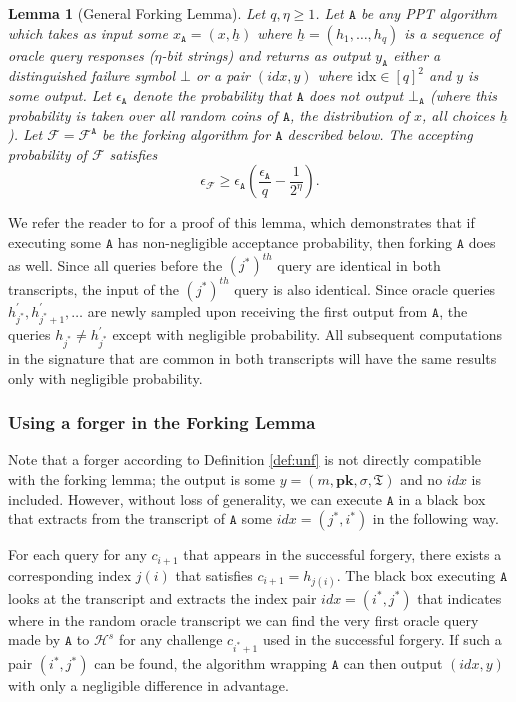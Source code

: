 \documentclass{article}
\theoremstyle{plain}
\newtheorem{lemma}{Lemma}[section]
\theoremstyle{definition}
\begin{document}
\begin{lemma}[General Forking Lemma]\label{lem:fork}
Let $q, \eta \geq 1$. Let $\texttt{A}$ be any PPT algorithm which takes as input some $x_\texttt{A} = (x, \underline{h})$ where $\underline{h} = (h_1, \ldots, h_q)$ is a sequence of oracle query responses ($\eta$-bit strings) and returns as output $y_{\texttt{A}}$ either a distinguished failure symbol $\bot$ or a pair $(\textit{idx}, y)$ where $\text{idx} \in [q]^2$ and $y$ is some output. Let $\epsilon_{\texttt{A}}$ denote the probability that $\texttt{A}$ does not output $\bot_{\texttt{A}}$ (where this probability is taken over all random coins of $\texttt{A}$, the distribution of $x$, all choices $\underline{h}$). Let $\mathcal{F} = \mathcal{F}^{\texttt{A}}$ be the forking algorithm for $\texttt{A}$ described below. The accepting probability of $\mathcal{F}$ satisfies \[\epsilon_{\mathcal{F}} \geq \epsilon_{\texttt{A}} \left(\frac{\epsilon_{\texttt{A}}}{q} - \frac{1}{2^\eta}\right).\]
\end{lemma}

We refer the reader to \cite{bellare} for a proof of this lemma, which demonstrates that if executing some $\texttt{A}$ has non-negligible acceptance probability, then forking $\texttt{A}$ does as well. Since all queries before the $(j^*)^{th}$ query are identical in both transcripts, the input of the $(j^*)^{th}$ query is also identical. Since oracle queries $h_{j^*}^{\prime}, h_{j^*+1}^{\prime}, \ldots$ are newly sampled upon receiving the first output from $\texttt{A}$, the queries $h_{j^*} \neq h_{j^*}^\prime$ except with negligible probability. All subsequent computations in the signature that are common in both transcripts will have the same results only with negligible probability. 


\subsubsection{Using a forger in the Forking Lemma}

Note that a forger according to Definition \ref{def:unf} is not directly compatible with the forking lemma; the output is some $y = (m, \textbf{pk}, \sigma, \mathfrak{T})$ and no $\textit{idx}$ is included.  However, without loss of generality, we can execute $\texttt{A}$ in a black box that extracts from the transcript of $\texttt{A}$ some $\textit{idx} = (j^*, i^*)$ in the following way. 

For each query for any $c_{i+1}$ that appears in the successful forgery, there exists a corresponding index $j(i)$ that satisfies $c_{i+1} = h_{j(i)}$. The black box executing $\texttt{A}$ looks at the transcript and extracts the index pair $\textit{idx} = (i^*, j^*)$ that indicates where in the random oracle transcript we can find the very first oracle query made by $\texttt{A}$ to $\mathcal{H}^s$ for any challenge $c_{i^*+1}$ used in the successful forgery. If such a pair $(i^*, j^*)$ can be found, the algorithm wrapping $\texttt{A}$ can then output $(\textit{idx}, y)$ with only a negligible difference in advantage. 
\end{document}

